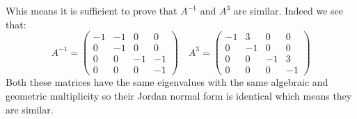 \documentclass[11pt,a4paper]{article}
\theoremstyle{plain}
\begin{document}
	Whis means it is sufficient to prove that $A^{-1}$ and $A^3$ are similar.
	Indeed we see that:
	\[
		A^{-1} = \left(\begin{matrix}
		-1 & -1 & 0 & 0 \\
		0 & -1 & 0 & 0 \\
		0 & 0 & -1 & -1 \\
		0 & 0 & 0 & -1
		\end{matrix}\right) \quad
		A^{3} = \left(\begin{matrix}
		-1 & 3 & 0 & 0 \\
		0 & -1 & 0 & 0 \\
		0 & 0 & -1 & 3 \\
		0 & 0 & 0 & -1
		\end{matrix}\right)
	\]
	Both these matrices have the same eigenvalues with the same algebraic
	and geometric multiplicity so their Jordan normal form is identical
	which means they are similar.
	
\end{document}
